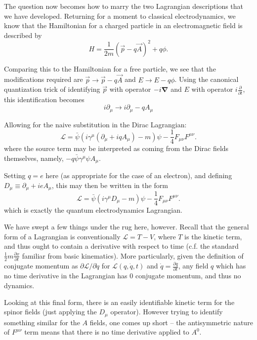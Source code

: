 The question now becomes how to marry the two Lagrangian descriptions that we have developed.
Returning for a moment to classical electrodynamics, we know that the Hamiltonian for a charged 
particle in an electromagnetic field is described by 
\begin{equation}
H = \frac{1}{2m}(\vec{p} - q\vec{A})^2 + q\phi.
\end{equation}

Comparing this to the Hamiltonian for a free particle, we see that the modifications required 
are $\vec{p} \rightarrow \vec{p} - q\vec{A}$ and $E\rightarrow E- q\phi$. Using the canonical 
quantization trick of identifying $\vec{p}$ with operator $-i\grad$ and $E$ with operator 
$i\frac{\partial}{\partial t}$, this identification becomes
\begin{equation}
i\partial_{\mu} \rightarrow i\partial_{\mu}-q A_{\mu}
\end{equation}

Allowing for the naive substitution in the Dirac Lagrangian:
\begin{equation}
\mathcal{L} = \bar{\psi}(i\gamma^{\mu}(\partial_{\mu}+iq A_{\mu}) - m)\psi -\frac{1}{4} F_{\mu\nu}F^{\mu\nu}.
\end{equation}
where the source term may be interpreted as coming from the Dirac fields themselves, 
namely, $-q\bar{\psi}\gamma^{\mu}\psi A_{\mu}$.

Setting $q=e$ here (as appropriate for the case of an electron), and defining 
$D_{\mu} \equiv \partial_{\mu} + ieA_{\mu}$, this may then be written in the form
\begin{equation}
\mathcal{L} = \bar{\psi}(i\gamma^{\mu}D_{\mu} - m)\psi -\frac{1}{4} F_{\mu\nu}F^{\mu\nu}.
\end{equation}
which is exactly the quantum electrodynamics Lagrangian.

We have swept a few things under the rug here, however. Recall that the general 
form of a Lagrangian is conventionally $\mathcal{L} = T - V$, where $T$ is the kinetic term, 
and thus ought to contain a derivative with respect to time (c.f. the standard 
$\frac{1}{2}m\frac{\partial x}{\partial t}$ familiar from basic kinematics). More particularly,
given the definition of conjugate momentum as $\partial \mathcal{L}/\partial \dot{q}$ for 
$\mathcal{L}(q, \dot{q}, t)$ and $\dot{q} = \frac{\partial q}{\partial t}$, any field $q$ which 
has no time derivative in the Lagrangian has $0$ conjugate momentum, and thus no dynamics. 

Looking at this final form, there is an easily identifiable kinetic term for the spinor fields (just applying 
the $D_{\mu}$ operator). However trying to identify something similar for the $A$ fields, one 
comes up short -- the antisymmetric nature of $F^{\mu\nu}$ term means that there
is no time derivative applied to $A^0$.

